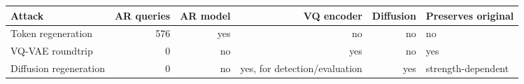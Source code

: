 \begin{tabular}{lrrrrl}
\toprule
Attack & AR queries & AR model & VQ encoder & Diffusion & Preserves original \\
\midrule
Token regeneration & 576 & yes & no & no & no \\
VQ-VAE roundtrip & 0 & no & yes & no & yes \\
Diffusion regeneration & 0 & no & yes, for detection/evaluation & yes & strength-dependent \\
\bottomrule
\end{tabular}
